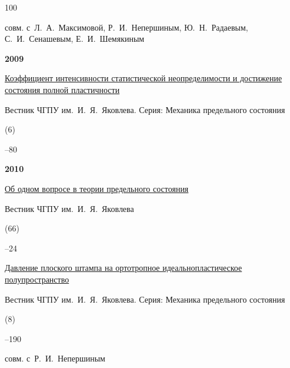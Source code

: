 \begin{thebibliography}{100}


\miscnote совм. с~Л.~А.~Максимовой, Р.~И.~Непершиным, Ю.~Н.~Радаевым, С.~И.~Сенашевым, Е.~И.~Шемякиным




\item[] \centerline{\bf 2009}




\paper \href{http://elibrary.ru/item.asp?id=11769960}{Коэффициент интенсивности статистической неопределимости и достижение состояния полной пластичности} 

\jour Вестник ЧГПУ им.~И.~Я.~Яковлева. Серия: Механика предельного состояния


(6)

--80




\item[] \centerline{\bf 2010}




\paper \href{http://elibrary.ru/item.asp?id=13617104}{Об одном вопросе в теории предельного состояния}

\jour Вестник ЧГПУ им.~И.~Я.~Яковлева


(66)

–24





\paper \href{http://elibrary.ru/item.asp?id=16534968}{Давление плоского штампа на ортотропное идеальнопластическое полупространство}

\jour Вестник ЧГПУ им.~И.~Я.~Яковлева. Серия: Механика предельного состояния


(8)

–190 

\miscnote совм. с~Р.~И.~Непершиным





\end{thebibliography}
